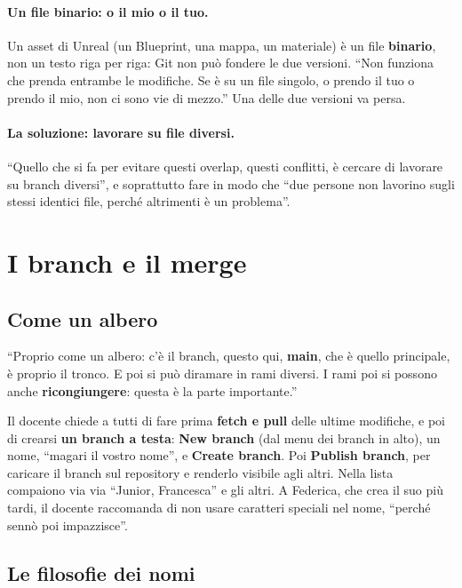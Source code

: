 \paragraph{Un file binario: o il mio o il tuo.} Un asset di Unreal (un
Blueprint, una mappa, un materiale) è un file \textbf{binario}, non un testo
riga per riga: Git non può fondere le due versioni. ``Non funziona che prenda
entrambe le modifiche. Se è su un file singolo, o prendo il tuo o prendo il mio,
non ci sono vie di mezzo.'' Una delle due versioni va persa.

\paragraph{La soluzione: lavorare su file diversi.} ``Quello che si fa per
evitare questi overlap, questi conflitti, è cercare di lavorare su branch
diversi'', e soprattutto fare in modo che ``due persone non lavorino sugli
stessi identici file, perché altrimenti è un problema''.

\section{I branch e il merge}
\label{gd13:sec:branch}

\subsection{Come un albero}

``Proprio come un albero: c'è il branch, questo qui, \textbf{main}, che è quello
principale, è proprio il tronco. E poi si può diramare in rami diversi. I rami
poi si possono anche \textbf{ricongiungere}: questa è la parte importante.''

Il docente chiede a tutti di fare prima \textbf{fetch e pull} delle ultime
modifiche, e poi di crearsi \textbf{un branch a testa}: \textbf{New branch} (dal
menu dei branch in alto), un nome, ``magari il vostro nome'', e \textbf{Create
branch}. Poi \textbf{Publish branch}, per caricare il branch sul repository e
renderlo visibile agli altri. Nella lista compaiono via via ``Junior,
Francesca'' e gli altri. A Federica, che crea il suo più tardi, il docente
raccomanda di non usare caratteri speciali nel nome, ``perché sennò poi
impazzisce''.

\subsection{Le filosofie dei nomi}

